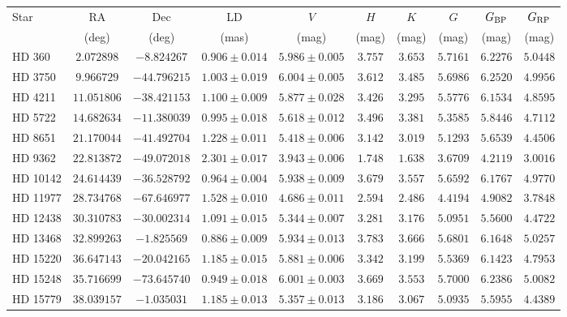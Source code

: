 \documentclass[linenumbers,trackchanges]{aastex701}
\begin{document}
\begin{table}[htbp]
\begin{tabular}{lccccccccc}
\hline
\hline
Star & RA & Dec & LD & $V$ & $H$ & $K$ & $G$ & $G_{\rm BP}$ & $G_{\rm RP}$ \\
 & (deg) & (deg) & (mas) & (mag) & (mag) & (mag) & (mag) & (mag) & (mag) \\
\hline
HD 360 & $2.072898$ & $-8.824267$ & $0.906 \pm 0.014$ & $5.986 \pm 0.005$ & $3.757$ & $3.653$ & $5.7161$ & $6.2276$ & $5.0448$ \\
HD 3750 & $9.966729$ & $-44.796215$ & $1.003 \pm 0.019$ & $6.004 \pm 0.005$ & $3.612$ & $3.485$ & $5.6986$ & $6.2520$ & $4.9956$ \\
HD 4211 & $11.051806$ & $-38.421153$ & $1.100 \pm 0.009$ & $5.877 \pm 0.028$ & $3.426$ & $3.295$ & $5.5776$ & $6.1534$ & $4.8595$ \\
HD 5722 & $14.682634$ & $-11.380039$ & $0.995 \pm 0.018$ & $5.618 \pm 0.012$ & $3.496$ & $3.381$ & $5.3585$ & $5.8446$ & $4.7112$ \\
HD 8651 & $21.170044$ & $-41.492704$ & $1.228 \pm 0.011$ & $5.418 \pm 0.006$ & $3.142$ & $3.019$ & $5.1293$ & $5.6539$ & $4.4506$ \\
HD 9362 & $22.813872$ & $-49.072018$ & $2.301 \pm 0.017$ & $3.943 \pm 0.006$ & $1.748$ & $1.638$ & $3.6709$ & $4.2119$ & $3.0016$ \\
HD 10142 & $24.614439$ & $-36.528792$ & $0.964 \pm 0.004$ & $5.938 \pm 0.009$ & $3.679$ & $3.557$ & $5.6592$ & $6.1767$ & $4.9770$ \\
HD 11977 & $28.734768$ & $-67.646977$ & $1.528 \pm 0.010$ & $4.686 \pm 0.011$ & $2.594$ & $2.486$ & $4.4194$ & $4.9082$ & $3.7848$ \\
HD 12438 & $30.310783$ & $-30.002314$ & $1.091 \pm 0.015$ & $5.344 \pm 0.007$ & $3.281$ & $3.176$ & $5.0951$ & $5.5600$ & $4.4722$ \\
HD 13468 & $32.899263$ & $-1.825569$ & $0.886 \pm 0.009$ & $5.934 \pm 0.013$ & $3.783$ & $3.666$ & $5.6801$ & $6.1648$ & $5.0257$ \\
HD 15220 & $36.647143$ & $-20.042165$ & $1.185 \pm 0.015$ & $5.881 \pm 0.006$ & $3.342$ & $3.199$ & $5.5369$ & $6.1423$ & $4.7953$ \\
HD 15248 & $35.716699$ & $-73.645740$ & $0.949 \pm 0.018$ & $6.001 \pm 0.003$ & $3.669$ & $3.553$ & $5.7000$ & $6.2386$ & $5.0082$ \\
HD 15779 & $38.039157$ & $-1.035031$ & $1.185 \pm 0.013$ & $5.357 \pm 0.013$ & $3.186$ & $3.067$ & $5.0935$ & $5.5955$ & $4.4389$ \\

\end{tabular}
\end{table}
\end{document}
